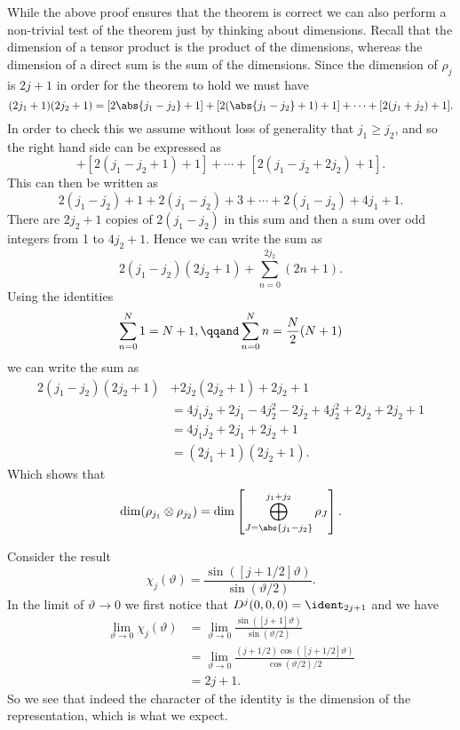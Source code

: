 While the above proof ensures that the theorem is correct we can also perform a non-trivial test of the theorem just by thinking about dimensions.
Recall that the dimension of a tensor product is the product of the dimensions, whereas the dimension of a direct sum is the sum of the dimensions.
Since the dimension of \(\rho_j\) is \(2j + 1\) in order for the theorem to hold we must have
\begin{equation}
    (2j_1 + 1)(2j_2 + 1) = [2\abs{j_1 - j_2} + 1] + [2(\abs{j_1 - j_2} + 1) + 1] + \dotsb + [2(j_1 + j_2) + 1].
\end{equation}
In order to check this we assume without loss of generality that \(j_1 \ge j_2\), and so the right hand side can be expressed as
\begin{equation}
    [2(j_1 - j_2) + 1] + [2(j_1 - j_2 + 1) + 1] + \dotsb + [2(j_1 - j_2 + 2j_2) + 1].
\end{equation}
This can then be written as
\begin{equation}
    2(j_1 - j_2) + 1 + 2(j_1 - j_2) + 3 + \dotsb + 2(j_1 - j_2) + 4j_1 + 1.
\end{equation}
There are \(2j_2 + 1\) copies of \(2(j_1 - j_2)\) in this sum and then a sum over odd integers from 1 to \(4j_2 + 1\).
Hence we can write the sum as
\begin{equation}
    2(j_1 - j_2) (2j_2 + 1) + \sum_{n = 0}^{2j_2}(2n + 1).
\end{equation}
Using the identities
\begin{equation}
    \sum_{n = 0}^{N} 1 = N + 1, \qqand \sum_{n = 0}^{N} n = \frac{N}{2}(N + 1)
\end{equation}
we can write the sum as
\begin{align}
    2(j_1 - j_2)(2j_2 + 1) &+ 2j_2(2j_2 + 1) + 2j_2 + 1\\
    &= 4j_1j_2 + 2j_1 - 4j_2^2 - 2j_2 + 4j_2^2 + 2j_2 +2j_2 + 1\\
    &= 4j_1j_2 + 2j_1 + 2j_2 + 1\\
    &= (2j_1 + 1)(2j_2 + 1).
\end{align}
Which shows that
\begin{equation}
    \dim(\rho_{j_1} \directproduct \rho_{j_2}) = \dim\left[ \bigoplus_{J = \abs{j_1 - j_2}}^{j_1 + j_2} \rho_J \right].
\end{equation}

Consider the result
\begin{equation}
    \chi_j(\vartheta) = \frac{\sin([j + 1/2]\vartheta)}{\sin(\vartheta/2)}.
\end{equation}
In the limit of \(\vartheta \to 0\) we first notice that \(D^j(0, 0, 0) = \ident_{2j + 1}\) and we have
\begin{align}
    \lim_{\vartheta \to 0} \chi_j(\vartheta) &= \lim_{\vartheta \to 0} \frac{\sin([j + 1]\vartheta)}{\sin(\vartheta/2)}\\
    &= \lim_{\vartheta \to 0} \frac{(j + 1/2)\cos([j + 1/2]\vartheta)}{\cos(\vartheta/2)/2}\\
    &= 2j + 1.
\end{align}
So we see that indeed the character of the identity is the dimension of the representation, which is what we expect.

